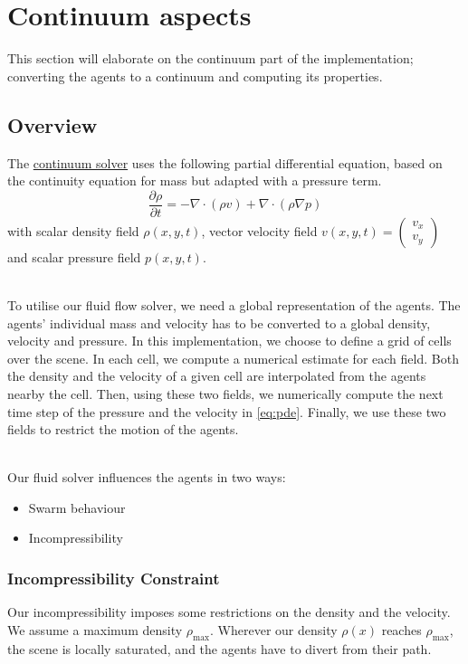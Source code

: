\documentclass{article}
\begin{document}
\section{Continuum aspects}
\label{sec:continuum}
This section will elaborate on the continuum part of the implementation; converting the agents to a continuum and computing its properties.
\subsection{Overview}
The \underline{continuum solver} uses the following partial differential equation, based on the continuity equation for mass but adapted with a pressure term.
\begin{equation}\label{eq:pde}
\frac{\partial \rho}{\partial t} =-\nabla \cdot(\rho{v}) + \nabla \cdot (\rho\nabla p)
\end{equation}
with scalar density field $\rho(x,y,t)$, vector velocity field $v(x,y,t) = \begin{pmatrix}v_x\\v_y\end{pmatrix}$ and scalar pressure field $p(x,y,t)$.

\ \\
To utilise our fluid flow solver, we need a global representation of the agents. The agents' individual mass and velocity has to be converted to a global density, velocity and pressure. In this implementation, we choose to define a grid of cells over the scene. In each cell, we compute a numerical estimate for each field. Both the density and the velocity of a given cell are interpolated from the agents nearby the cell. Then, using these two fields, we numerically compute the next time step of the pressure and the velocity in \eqref{eq:pde}. Finally, we use these two fields to restrict the motion of the agents.

\ \\
Our fluid solver influences the agents in two ways: 
\begin{itemize}
\item Swarm behaviour
\item Incompressibility
\end{itemize}
\subsubsection{Incompressibility Constraint}
Our incompressibility imposes some restrictions on the density and the velocity. We assume a maximum density $\rho_{\max}$. Wherever our density $\rho(x)$ reaches $\rho_{\max}$, the scene is locally saturated, and the agents have to divert from their path. 
\end{document}
